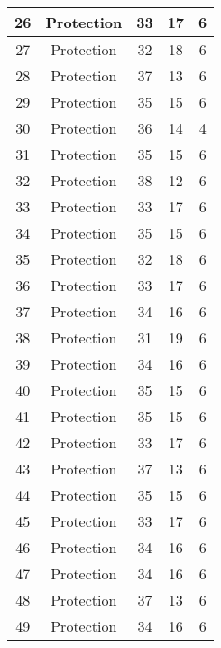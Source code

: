 \documentclass[results.tex]{subfiles}
\begin{document}
\begin{center}
\begin{tabular}{| c || c | c | c | c |}
    \hline
    26 & Protection & 33 & 17 & 6 \\ 
    \hline
    27 & Protection & 32 & 18 & 6 \\ 
    \hline
    28 & Protection & 37 & 13 & 6 \\ 
    \hline
    29 & Protection & 35 & 15 & 6 \\ 
    \hline
    30 & Protection & 36 & 14 & 4 \\ 
    \hline
    31 & Protection & 35 & 15 & 6 \\ 
    \hline
    32 & Protection & 38 & 12 & 6 \\ 
    \hline
    33 & Protection & 33 & 17 & 6 \\ 
    \hline
    34 & Protection & 35 & 15 & 6 \\ 
    \hline
    35 & Protection & 32 & 18 & 6 \\ 
    \hline
    36 & Protection & 33 & 17 & 6 \\ 
    \hline
    37 & Protection & 34 & 16 & 6 \\ 
    \hline
    38 & Protection & 31 & 19 & 6 \\ 
    \hline
    39 & Protection & 34 & 16 & 6 \\ 
    \hline
    40 & Protection & 35 & 15 & 6 \\ 
    \hline
    41 & Protection & 35 & 15 & 6 \\ 
    \hline
    42 & Protection & 33 & 17 & 6 \\ 
    \hline
    43 & Protection & 37 & 13 & 6 \\ 
    \hline
    44 & Protection & 35 & 15 & 6 \\ 
    \hline
    45 & Protection & 33 & 17 & 6 \\ 
    \hline
    46 & Protection & 34 & 16 & 6 \\ 
    \hline
    47 & Protection & 34 & 16 & 6 \\ 
    \hline
    48 & Protection & 37 & 13 & 6 \\ 
    \hline
    49 & Protection & 34 & 16 & 6 \\ 
    \hline   \end{tabular}
\end{center}
\end{document}
